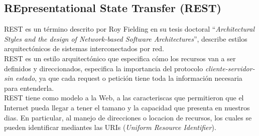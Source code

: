


%


\subsection{REpresentational State Transfer (REST)} %
\label{sub:rest}

%



  REST es un término descrito por Roy Fielding en su tesis doctoral ``\emph{Architectural Styles and the design of Network-based Software Architectures}'', describe estilos arquitectónicos de sistemas interconectados por red. \cite{web6}\\

  REST es un estilo arquitectónico que especifica cómo los recursos van a ser definidos y direccionados, especifica la importancia del protocolo \emph{cliente-servidor-sin estado}, ya que cada request o petición tiene toda la información necesaria para entenderla.\\

  REST tiene como modelo a la Web, a las caracteriscas que permitieron que el Internet pueda llegar a tener el tamano y la capacidad que presenta en nuestros dias. En particular, al manejo de direcciones o locacion de recursos, los cuales se pueden identificar mediantes las URIs (\emph{Uniform Resource Identifier}). \cite{uri}

